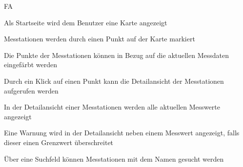 \begin{Kriterien}{FA}
    \item Als Startseite wird dem Benutzer eine Karte angezeigt
    \item Messtationen werden durch einen Punkt auf der Karte markiert
    \item Die Punkte der Messtationen können in Bezug auf die aktuellen Messdaten eingefärbt werden
    \item Durch ein Klick auf einen Punkt kann die Detailansicht der Messtationen aufgerufen werden
    \item In der Detailansicht einer Messtationen werden alle aktuellen Messwerte angezeigt
    \item Eine Warnung wird in der Detailansicht neben einem Messwert angezeigt, falls dieser einen Grenzwert überschreitet
    \item Über eine Suchfeld können Messtationen mit dem Namen gesucht werden
    \item 
\end{Kriterien}